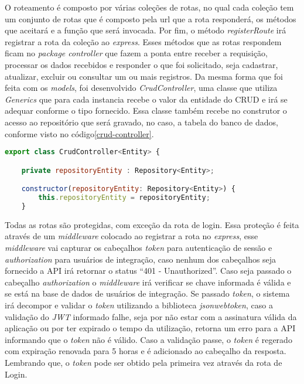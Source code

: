 O roteamento é composto por várias coleções de rotas, no qual cada coleção tem um conjunto de rotas que é composto pela url que a rota responderá, os métodos que aceitará e a função que será invocada.
Por fim, o método \textit{registerRoute} irá registrar a rota da coleção ao \textit{express}.
Esses métodos que as rotas respondem ficam no \textit{package controller} que fazem a ponta entre receber a requisição, processar os dados recebidos e responder o que foi solicitado, seja cadastrar, atualizar, excluir ou consultar um ou mais registros.
Da mesma forma que foi feita com os \textit{models}, foi desenvolvido \textit{CrudController}, uma classe que utiliza \textit{Generics} que para cada instancia recebe o valor da entidade do CRUD e irá se adequar conforme o tipo fornecido. Essa classe também recebe no construtor o acesso ao repositório que será gravado, no caso, a tabela do banco de dados, conforme visto no código\ref{crud-controller}.

\begin{lstlisting}[language=JavaScript, caption={CrudController}, label={crud-controller}]
export class CrudController<Entity> {

	private repositoryEntity : Repository<Entity>;

	constructor(repositoryEntity: Repository<Entity>) {
		this.repositoryEntity = repositoryEntity;
	}
\end{lstlisting}

Todas as rotas são protegidas, com exceção da rota de login. Essa proteção é feita através de um \textit{middleware} colocado ao registrar a rota no \textit{express}, esse \textit{middleware} vai capturar os cabeçalhos \textit{token} para autenticação de sessão e \textit{authorization} para usuários de integração, caso nenhum dos cabeçalhos seja fornecido a API irá retornar o status ``401 - Unauthorized''. Caso seja passado o cabeçalho \textit{authorization} o \textit{middleware} irá verificar se chave informada é válida e se está na base de dados de usuários de integração. Se passado \textit{token}, o sistema irá decompor e validar o \textit{token} utilizando a biblioteca \textit{jsonwebtoken}, caso a validação do \textit{JWT} informado falhe, seja por não estar com a assinatura válida da aplicação ou por ter expirado o tempo da utilização, retorna um erro para a API informando que o \textit{token} não é válido. Caso a validação passe, o \textit{token} é regerado com expiração renovada para 5 horas e é adicionado ao cabeçalho da resposta. Lembrando que, o \textit{token} pode ser obtido pela primeira vez através da rota de Login.

